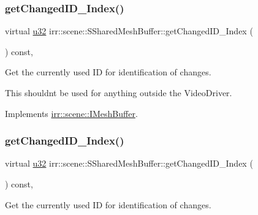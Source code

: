 \subsubsection{\texorpdfstring{get\+Changed\+I\+D\+\_\+\+Index()}{getChangedID\_Index()}\hspace{0.1cm}{\footnotesize\ttfamily [1/2]}}
{\footnotesize\ttfamily virtual \hyperlink{namespaceirr_a0416a53257075833e7002efd0a18e804}{u32} irr\+::scene\+::\+S\+Shared\+Mesh\+Buffer\+::get\+Changed\+I\+D\+\_\+\+Index (\begin{DoxyParamCaption}{ }\end{DoxyParamCaption}) const\hspace{0.3cm}{\ttfamily [inline]}, {\ttfamily [virtual]}}



Get the currently used ID for identification of changes. 

This shouldn\textquotesingle{}t be used for anything outside the Video\+Driver. 

Implements \hyperlink{classirr_1_1scene_1_1IMeshBuffer_acc389d76856dfb06c3ba45a92315e6d8}{irr\+::scene\+::\+I\+Mesh\+Buffer}.

\mbox{\label{structirr_1_1scene_1_1SSharedMeshBuffer_a0a37d52f7ec9917d9ca0d9dd908917b9}} 
\subsubsection{\texorpdfstring{get\+Changed\+I\+D\+\_\+\+Index()}{getChangedID\_Index()}\hspace{0.1cm}{\footnotesize\ttfamily [2/2]}}
{\footnotesize\ttfamily virtual \hyperlink{namespaceirr_a0416a53257075833e7002efd0a18e804}{u32} irr\+::scene\+::\+S\+Shared\+Mesh\+Buffer\+::get\+Changed\+I\+D\+\_\+\+Index (\begin{DoxyParamCaption}{ }\end{DoxyParamCaption}) const\hspace{0.3cm}{\ttfamily [inline]}, {\ttfamily [virtual]}}



Get the currently used ID for identification of changes. 

